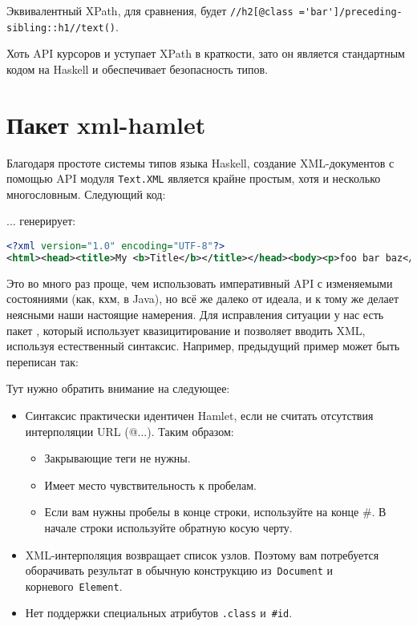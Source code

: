 \begin{remark}
    Эквивалентный XPath, для сравнения, будет
    \lstinline!//h2[@class ='bar']/preceding-sibling::h1//text()!.
\end{remark}

Хоть API курсоров и уступает XPath в краткости, зато он является стандартным
кодом на Haskell и обеспечивает безопасность типов.

\section{Пакет xml-hamlet}
Благодаря простоте системы типов языка Haskell, создание XML-документов с
помощью API модуля \lstinline!Text.XML! является крайне простым, хотя и
несколько многословным. Следующий код:


... генерирует:

\begin{lstlisting}[language=XML]
<?xml version="1.0" encoding="UTF-8"?>
<html><head><title>My <b>Title</b></title></head><body><p>foo bar baz</p></body></html>
\end{lstlisting}

Это во много раз проще, чем использовать императивный API с изменяемыми
состояниями (как, кхм, в Java), но всё же далеко от идеала, и к тому же делает
неясными наши настоящие намерения. Для исправления ситуации у нас есть пакет
,
который использует квазицитирование и позволяет вводить XML, используя
естественный синтаксис. Например, предыдущий пример может быть переписан так:


Тут нужно обратить внимание на следующее:
\begin{itemize}
  \item Синтаксис практически идентичен Hamlet, если не считать отсутствия
      интерполяции URL (@{...}). Таким образом:
    \begin{itemize}
      \item Закрывающие теги не нужны.

      \item Имеет место чувствительность к пробелам.

      \item Если вам нужны пробелы в конце строки, используйте на конце \#. В
          начале строки используйте обратную косую черту.
    \end{itemize}
  
  \item XML-интерполяция возвращает список узлов. Поэтому вам потребуется
      оборачивать результат в обычную конструкцию из~\lstinline!Document! и
      корневого~\lstinline!Element!.

  \item Нет поддержки специальных атрибутов \lstinline!.class!
      и~\lstinline!#id!.
\end{itemize}


